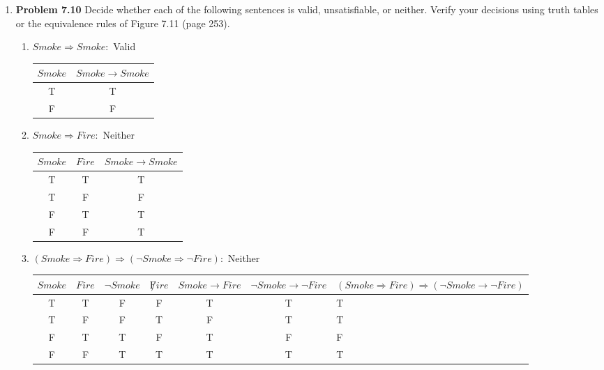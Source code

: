 \documentclass[10pt]{article}
\begin{document}
\begin{enumerate}
\item \textbf{Problem 7.10} Decide whether each of the following sentences is valid, unsatisfiable, or neither. Verify your decisions using truth tables or the equivalence rules of Figure 7.11 (page 253).
  \begin{enumerate}
  \item $Smoke \Rightarrow Smoke:$ Valid 
    \begin{center}
      \begin{tabular}{|c|c|}
        \hline
        $Smoke$ & $Smoke \rightarrow Smoke$ \\
        \hline
        T & T \\
        \hline
        F & F \\
        \hline
      \end{tabular}
    \end{center}
\item $Smoke \Rightarrow Fire:$ Neither 
    \begin{center}
      \begin{tabular}{|c|c|c|}
        \hline
        $Smoke$ & $Fire$ & $Smoke \rightarrow Smoke$ \\
        \hline
        T & T & T\\
        \hline
        T & F & F\\
        \hline
        F & T & T\\
        \hline
        F & F & T\\
        \hline
      \end{tabular}
    \end{center}
\item $(Smoke \Rightarrow Fire) \Rightarrow (\lnot Smoke \Rightarrow \lnot Fire):$ Neither 
    \begin{center}
      \begin{tabular}{|c|c|c|c|c|c|p{4cm}|}
        \hline
        $Smoke$ & $Fire$ & $\lnot Smoke$ & $\not Fire$ & $Smoke \rightarrow Fire$ & $\lnot Smoke \rightarrow \lnot Fire$ & $(Smoke \Rightarrow Fire) \Rightarrow (\lnot Smoke \rightarrow \lnot Fire)$\\
        \hline
        T & T & F & F & T & T & T \\
        \hline
        T & F & F & T & F & T & T \\
        \hline
        F & T & T & F & T & F & F \\
        \hline
        F & F & T & T & T & T & T \\
        \hline
      \end{tabular}

\end{center}
\end{enumerate}
\end{enumerate}
\end{document}
